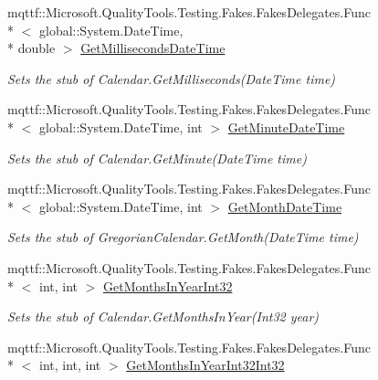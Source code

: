 \begin{DoxyCompactItemize}
mqttf\-::\-Microsoft.\-Quality\-Tools.\-Testing.\-Fakes.\-Fakes\-Delegates.\-Func\\*
$<$ global\-::\-System.\-Date\-Time, \\*
double $>$ \hyperlink{class_system_1_1_globalization_1_1_fakes_1_1_stub_gregorian_calendar_ab39a1e2e4ed917e237e36308d8435abd}{Get\-Milliseconds\-Date\-Time}
\begin{DoxyCompactList}\small\item\em Sets the stub of Calendar.\-Get\-Milliseconds(\-Date\-Time time)\end{DoxyCompactList}\item 
mqttf\-::\-Microsoft.\-Quality\-Tools.\-Testing.\-Fakes.\-Fakes\-Delegates.\-Func\\*
$<$ global\-::\-System.\-Date\-Time, int $>$ \hyperlink{class_system_1_1_globalization_1_1_fakes_1_1_stub_gregorian_calendar_ac95444366c3221aa92206aaba34147f8}{Get\-Minute\-Date\-Time}
\begin{DoxyCompactList}\small\item\em Sets the stub of Calendar.\-Get\-Minute(\-Date\-Time time)\end{DoxyCompactList}\item 
mqttf\-::\-Microsoft.\-Quality\-Tools.\-Testing.\-Fakes.\-Fakes\-Delegates.\-Func\\*
$<$ global\-::\-System.\-Date\-Time, int $>$ \hyperlink{class_system_1_1_globalization_1_1_fakes_1_1_stub_gregorian_calendar_ada39a0ed2e5d9bcd0804f87408cfda20}{Get\-Month\-Date\-Time}
\begin{DoxyCompactList}\small\item\em Sets the stub of Gregorian\-Calendar.\-Get\-Month(\-Date\-Time time)\end{DoxyCompactList}\item 
mqttf\-::\-Microsoft.\-Quality\-Tools.\-Testing.\-Fakes.\-Fakes\-Delegates.\-Func\\*
$<$ int, int $>$ \hyperlink{class_system_1_1_globalization_1_1_fakes_1_1_stub_gregorian_calendar_ad6bdfd8688505ec4340e3967b56754a0}{Get\-Months\-In\-Year\-Int32}
\begin{DoxyCompactList}\small\item\em Sets the stub of Calendar.\-Get\-Months\-In\-Year(\-Int32 year)\end{DoxyCompactList}\item 
mqttf\-::\-Microsoft.\-Quality\-Tools.\-Testing.\-Fakes.\-Fakes\-Delegates.\-Func\\*
$<$ int, int, int $>$ \hyperlink{class_system_1_1_globalization_1_1_fakes_1_1_stub_gregorian_calendar_a32d722d7d5656e3527022a2bece3e5a1}{Get\-Months\-In\-Year\-Int32\-Int32}

\end{DoxyCompactItemize}
